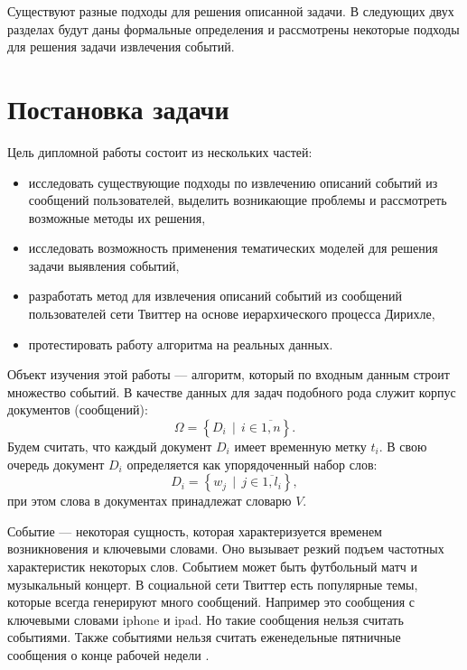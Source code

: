 \documentclass[12pt, a4paper]{article}
\DeclareMathOperator{\svert}{\,\vert\,}
\begin{document}
	Существуют разные подходы для решения описанной задачи. В следующих двух разделах будут даны формальные определения и рассмотрены некоторые подходы для решения задачи извлечения событий.
	
  \section{Постановка задачи}
	Цель дипломной работы состоит из нескольких частей:
\begin{itemize}
\item исследовать существующие подходы по извлечению описаний событий из сообщений пользователей, выделить возникающие проблемы и рассмотреть возможные методы их решения,
\item исследовать возможность применения тематических моделей для решения задачи выявления событий,
\item разработать метод для извлечения описаний событий из сообщений пользователей сети Твиттер на основе иерархического процесса Дирихле,
\item протестировать работу алгоритма на реальных данных.
\end{itemize}	  
  
  Объект изучения этой работы --- алгоритм, который по входным данным строит множество событий. В качестве данных для задач подобного рода служит корпус документов (сообщений):
\begin{equation}
  \Omega = \left\{D_i \svert i \in \overline{1,n} \right\}.
  \end{equation}  
  Будем считать, что каждый документ $D_i$ имеет временную метку $t_i$. В свою очередь документ $D_i$ определяется как упорядоченный набор слов:
\begin{equation}
  D_i = \left\{w_j \svert j \in \overline{ 1, l_i } \right\},
  \end{equation}  
   при этом слова в документах принадлежат словарю $V$. 
  
  Событие --- некоторая сущность, которая характеризуется временем возникновения и ключевыми словами. Оно вызывает резкий подъем частотных характеристик некоторых слов. Событием может быть футбольный матч и музыкальный концерт. В социальной сети Твиттер есть популярные темы, которые всегда генерируют много сообщений. Например это сообщения с ключевыми словами iphone и ipad. Но такие сообщения нельзя считать событиями. Также событиями нельзя считать еженедельные пятничные сообщения о конце рабочей недели \cite{waim13}.
  
\end{document}
